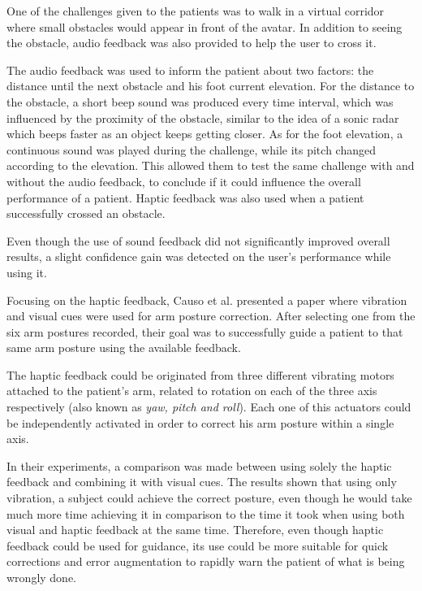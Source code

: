 One of the challenges given to the patients was to walk in a virtual corridor where small obstacles would appear in front of the avatar. 
In addition to seeing the obstacle, audio feedback was also provided to help the user to cross it.

The audio feedback was used to inform the patient about two factors: the distance until 
the next obstacle and his foot current elevation. 
For the distance to the obstacle, a short beep sound was produced every time interval, which was influenced by 
the proximity of the obstacle, similar to the idea of a sonic radar which beeps faster as an object keeps getting closer. 
As for the foot elevation, a continuous 
sound was played during the challenge, while its pitch changed according to the elevation. 
This allowed them to test the same challenge with and without the audio feedback, to conclude if it could 
influence the overall performance of a patient. Haptic feedback was also used when a patient successfully crossed an obstacle.

Even though the use of sound feedback did not significantly improved overall results, a
slight confidence gain was detected on the user's performance while using it.

Focusing on the haptic feedback, Causo et al.\cite{Causo2011} presented a 
paper where vibration and visual cues were used for arm posture correction.
After selecting one from the six arm postures recorded, their goal 
was to successfully guide a patient to that same arm posture using the available feedback.

The haptic feedback could be originated from three different 
vibrating motors attached to the patient's arm, related to 
rotation on each of the three axis respectively (also known 
as \textit{yaw, pitch and roll}). Each one of this actuators 
could be independently activated in order to correct his arm 
posture within a single axis.

In their experiments, a comparison was made between using solely 
the haptic feedback and combining it with visual cues. 
The results shown that using only vibration, a subject 
could achieve the correct posture, even though he would 
take much more time achieving it in comparison to the time 
it took when using both visual and haptic feedback at the same time.
Therefore, even though haptic feedback could be used for guidance, its use 
could be more suitable for quick corrections and error augmentation to rapidly 
warn the patient of what is being wrongly done. 

